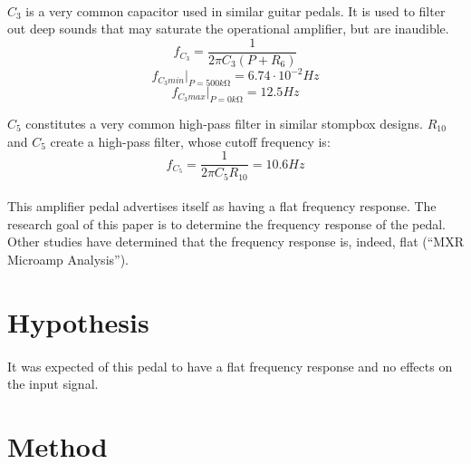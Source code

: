 \documentclass[a4paper, 12pt]{article}
\begin{document}
\paragraph*{}
$C_3$ is a very common capacitor used in similar guitar pedals. It is used to 
filter out deep sounds that may saturate the operational amplifier, but are 
inaudible.
$$f_{C_3} = \frac{1}{2 \pi C_3 (P + R_6)}$$
$$f_{C_3 min} |_{P = 500\si{k\ohm}} = 6.74 \cdot 10^{-2} \si{Hz}$$
$$f_{C_3 max} |_{P = 0\si{k\ohm}} = 12.5 \si{Hz}$$

$C_5$ constitutes a very common high-pass filter in similar stompbox designs. 
$R_{10}$ and $C_5$ create a high-pass filter, whose cutoff frequency is:
$$f_{C_5} = \frac{1}{2 \pi C_5 R_{10}} = 10.6 \si{Hz}$$

\paragraph*{}
This amplifier pedal advertises itself as having a flat frequency response. 
The research goal of this paper is to determine the frequency response of the 
pedal. Other studies have determined that the frequency response is, indeed, 
flat (``MXR Microamp Analysis'').

\section{Hypothesis}
\paragraph*{}
It was expected of this pedal to have a flat frequency response and no effects 
on the input signal.

\section{Method}
\end{document}
